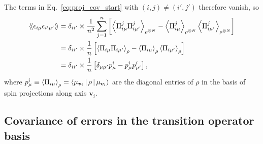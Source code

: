 \documentclass[notitlepage,twocolumn]{revtex4-2}
\newcommand{\f}[2]{\dfrac{#1}{#2}} %
\newcommand{\p}[1]{\left(#1\right)} %
\renewcommand{\sp}[1]{\left[#1\right]} %
\newcommand{\bk}{\Braket} %
\renewcommand{\v}{\bm} %
\newcommand{\bbk}[1]{\langle\!\langle #1 \rangle\!\rangle}
\begin{document}
The terms in Eq.~\eqref{eq:proj_cov_start} with $\p{i,j}\ne\p{i',j'}$ therefore vanish, so
\begin{align}
  \bbk{\epsilon_{i\mu} \epsilon_{i'\mu'}}
  &= \delta_{ii'} \times \f1{n^2} \sum_{j=1}^n \sp{\bk{\Pi_{i\mu}^j \Pi_{i\mu'}^j}_{\rho^{\otimes N}}
    - \bk{\Pi_{i\mu}^j}_{\rho^{\otimes N}}
    \bk{\Pi_{i\mu'}^j}_{\rho^{\otimes N}}} \\
  &= \delta_{ii'} \times \f1n \sp{\bk{\Pi_{i\mu} \Pi_{i\mu'}}_\rho
    - \bk{\Pi_{i\mu}}_\rho \bk{\Pi_{i\mu'}}_\rho} \\
  &= \delta_{ii'} \times \f1n \sp{\delta_{\mu\mu'} p_\mu^i - p_\mu^i p_{\mu'}^i},
\end{align}
where $p_\mu^i \equiv \bk{\Pi_{i\mu}}_\rho = \bk{\mu_{\v v_i}|\rho|\mu_{\v v_i}}$ are the diagonal entries of $\rho$ in the basis of spin projections along axis $\v v_i$.

\subsection{Covariance of errors in the transition operator basis}
\end{document}
